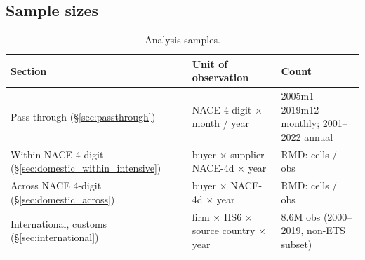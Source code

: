 \subsection{Sample sizes}

\begin{table}[H]
    \centering
    \caption{Analysis samples.}
    \label{tab:sample_sizes}
    \footnotesize
    \begin{tabular}{lll}
        \toprule
        Section & Unit of observation & Count \\
        \midrule
        Pass-through (\S\ref{sec:passthrough})           & NACE 4-digit $\times$ month / year                       & 2005m1--2019m12 monthly; 2001--2022 annual \\
        Within NACE 4-digit (\S\ref{sec:domestic_within_intensive})    & buyer $\times$ supplier-NACE-4d $\times$ year         & RMD: \notrun{} cells / obs \\
        Across NACE 4-digit (\S\ref{sec:domestic_across}) & buyer $\times$ NACE-4d $\times$ year                     & RMD: \notrun{} cells / obs \\
        International, customs (\S\ref{sec:international})         & firm $\times$ HS6 $\times$ source country $\times$ year & 8.6M obs (2000--2019, non-ETS subset) \\
        \bottomrule
    \end{tabular}
\end{table}
